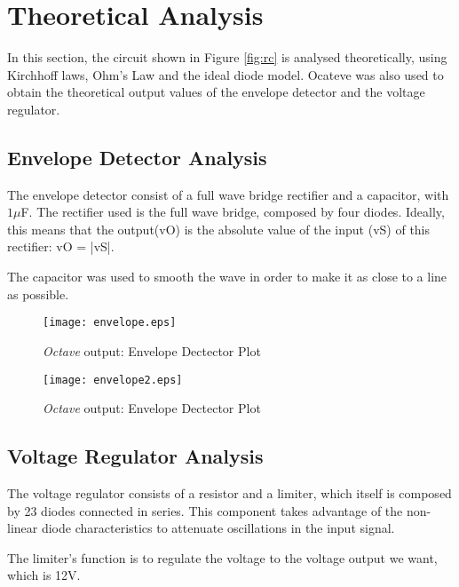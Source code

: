 \section{Theoretical Analysis} \label{sec:analysis}

In this section, the circuit shown in Figure \ref{fig:rc} is analysed theoretically, using Kirchhoff laws, Ohm's Law and the ideal diode model.
Ocateve was also used to obtain the theoretical output values of the envelope detector and the voltage regulator. 



\subsection{Envelope Detector Analysis}

The envelope detector consist of a full wave bridge rectifier and a capacitor, with $1\mu$F.
The rectifier used is the full wave bridge, composed by four diodes. Ideally, this means that the output(vO) is the absolute value of the input (vS) of this rectifier: vO = |vS|.

The capacitor was used to smooth the wave in order to make it as close to a line as possible.



\begin{figure}[h]
    \centering
    \texttt{[image: envelope.eps]}
    \caption{{\it Octave} output: Envelope Dectector Plot}
    \label{fig:OctaveOut}
\end{figure}

\begin{figure}[h]
    \centering
    \texttt{[image: envelope2.eps]}
    \caption{{\it Octave} output: Envelope Dectector Plot}
    \label{fig:OctaveOut}
\end{figure}



\subsection{Voltage Regulator Analysis}

The voltage regulator consists of a resistor and a limiter, which itself is composed by 23 diodes connected in series. This component takes advantage of the non-linear diode characteristics to attenuate oscillations in the input signal.

The limiter’s function is to regulate the voltage to the voltage output we want, which is 12V.

